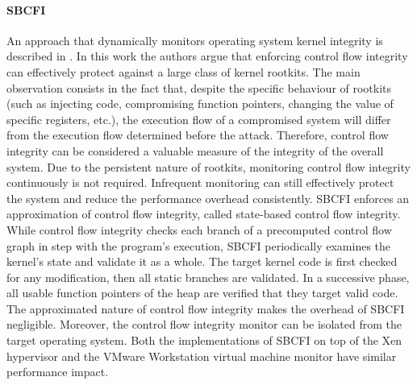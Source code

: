 \paragraph{SBCFI}
An approach that dynamically monitors operating system kernel integrity is described in \cite{SBCFI}. In this work the authors argue that enforcing control flow integrity can effectively protect against a large class of kernel rootkits. The main observation consists in the fact that, despite the specific behaviour of rootkits (such as injecting code, compromising function pointers, changing the value of specific registers, etc.), the execution flow of a compromised system will differ from the execution flow determined before the attack.
Therefore, control flow integrity can be considered a valuable measure of the integrity of the overall system.
Due to the persistent nature of rootkits, monitoring control flow integrity continuously is not required. Infrequent monitoring can still effectively protect the system and reduce the performance overhead consistently.
SBCFI enforces an approximation of control flow integrity, called state-based control flow integrity. While control flow integrity checks each branch of a precomputed control flow graph in step with the program's execution, SBCFI periodically examines the kernel's state and validate it as a whole.
The target kernel code is first checked for any modification, then all static branches are validated. In a successive phase, all usable function pointers of the heap are verified that they target valid code.
The approximated nature of control flow integrity makes the overhead of SBCFI negligible. Moreover, the control flow integrity monitor can be isolated from the target operating system. 
Both the implementations of SBCFI on top of the Xen hypervisor and the VMware Workstation virtual machine monitor have similar performance impact.




